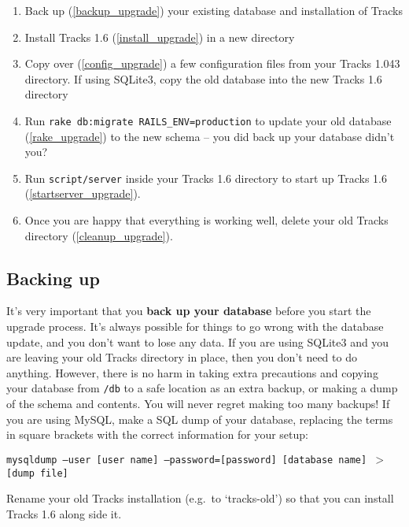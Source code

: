 \documentclass[10pt,twoside]{memoir}
\begin{document}
\begin{enumerate}


\item Back up (\autoref{backup_upgrade}) your existing database and installation of Tracks

\item Install Tracks 1.6 (\autoref{install_upgrade}) in a new directory

\item Copy over (\autoref{config_upgrade}) a few configuration files from your Tracks 1.043 directory. If using SQLite3, copy the old database into the new Tracks 1.6 directory

\item Run \texttt{rake db:migrate RAILS\_ENV=production} to update your old database (\autoref{rake_upgrade}) to the new schema -- you did back up your database didn't you?

\item Run \texttt{script/server} inside your Tracks 1.6 directory to start up Tracks 1.6 (\autoref{startserver_upgrade}).

\item Once you are happy that everything is working well, delete your old Tracks directory (\autoref{cleanup_upgrade}).
\end{enumerate}

\subsection{Backing up}
\label{backup_upgrade}

It's very important that you \textbf{back up your database} before you start the upgrade process. It's always possible for things to go wrong with the database update, and you don't want to lose any data. If you are using SQLite3 and you are leaving your old Tracks directory in place, then you don't need to do anything. However, there is no harm in taking extra precautions and copying your database from \texttt{/db} to a safe location as an extra backup, or making a dump of the schema and contents. You will never regret making too many backups! If you are using MySQL, make a SQL dump of your database, replacing the terms in square brackets with the correct information for your setup:


\texttt{mysqldump ---user [user name] ---password=[password] [database name] $>$ [dump file]}


Rename your old Tracks installation (e.g.\ to `tracks-old') so that you can install Tracks 1.6 along side it.
\end{document}
